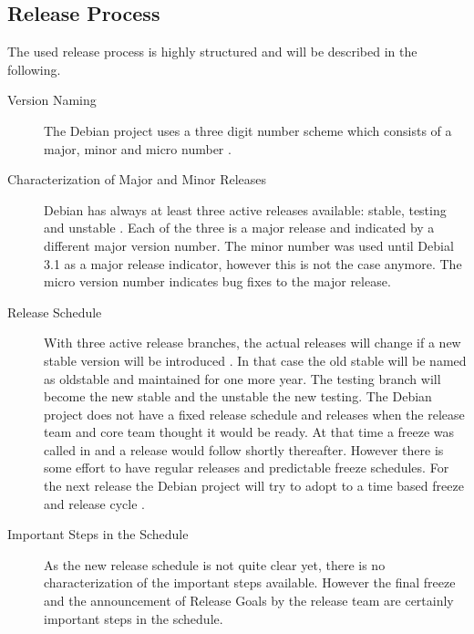\subsection{Release Process}

The used release process is highly structured and will be described in the
following.

\begin{description}

  \item[Version Naming] The Debian project uses a three digit number scheme
    which consists of a major, minor and micro number \cite{DebianReleases}.

  \item[Characterization of Major and Minor Releases] Debian has always at
    least three active releases available: stable, testing and unstable
    \cite{DebianReleases,DebianReleaseManagement}. Each of the three is a
    major release and indicated by a different major version number. The
    minor number was used until Debial 3.1 as a major release indicator,
    however this is not the case anymore. The micro version number indicates
    bug fixes to the major release.

  \item[Release Schedule] With three active release branches, the actual
    releases will change if a new stable version will be introduced
    \cite{McGovern2011,DebianReleaseManagement,DebianReleaseGoals}. In that
    case the old stable will be named as oldstable and maintained for one
    more year. The testing branch will become the new stable and the unstable
    the new testing. The Debian project does not have a fixed release
    schedule and releases when the release team and core team thought it
    would be ready. At that time a freeze was called in and a release would
    follow shortly thereafter. However there is some effort to have regular
    releases and predictable freeze schedules. For the next release the
    Debian project will try to adopt to a time based freeze and release cycle
    \cite{McGovern2011}.

  \item[Important Steps in the Schedule] As the new release schedule is not
    quite clear yet, there is no characterization of the important steps
    available. However the final freeze and the announcement of Release Goals
    by the release team are certainly important steps in the schedule.

\end{description}

